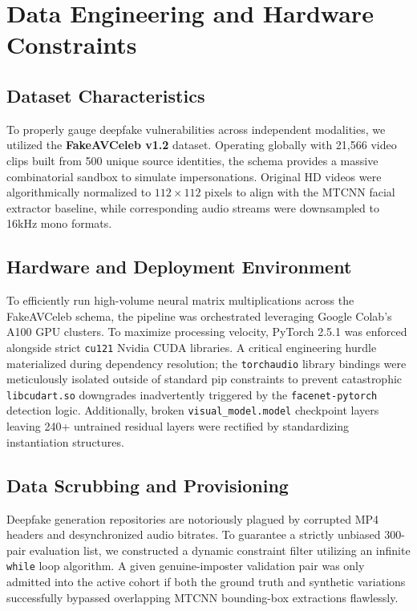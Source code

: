 \documentclass[conference]{IEEEtran}
\begin{document}
\section{Data Engineering and Hardware Constraints}

\subsection{Dataset Characteristics}
To properly gauge deepfake vulnerabilities across independent modalities, we utilized the \textbf{FakeAVCeleb v1.2} dataset. Operating globally with 21,566 video clips built from 500 unique source identities, the schema provides a massive combinatorial sandbox to simulate impersonations. Original HD videos were algorithmically normalized to $112 \times 112$ pixels to align with the MTCNN facial extractor baseline, while corresponding audio streams were downsampled to 16kHz mono formats. 

\subsection{Hardware and Deployment Environment}
To efficiently run high-volume neural matrix multiplications across the FakeAVCeleb schema, the pipeline was orchestrated leveraging Google Colab's A100 GPU clusters. To maximize processing velocity, PyTorch 2.5.1 was enforced alongside strict \texttt{cu121} Nvidia CUDA libraries. A critical engineering hurdle materialized during dependency resolution; the \texttt{torchaudio} library bindings were meticulously isolated outside of standard pip constraints to prevent catastrophic \texttt{libcudart.so} downgrades inadvertently triggered by the \texttt{facenet-pytorch} detection logic. Additionally, broken \texttt{visual\_model.model} checkpoint layers leaving 240+ untrained residual layers were rectified by standardizing instantiation structures.

\subsection{Data Scrubbing and Provisioning}
Deepfake generation repositories are notoriously plagued by corrupted MP4 headers and desynchronized audio bitrates. To guarantee a strictly unbiased 300-pair evaluation list, we constructed a dynamic constraint filter utilizing an infinite \texttt{while} loop algorithm. A given genuine-imposter validation pair was only admitted into the active cohort if both the ground truth and synthetic variations successfully bypassed overlapping MTCNN bounding-box extractions flawlessly.
\end{document}
